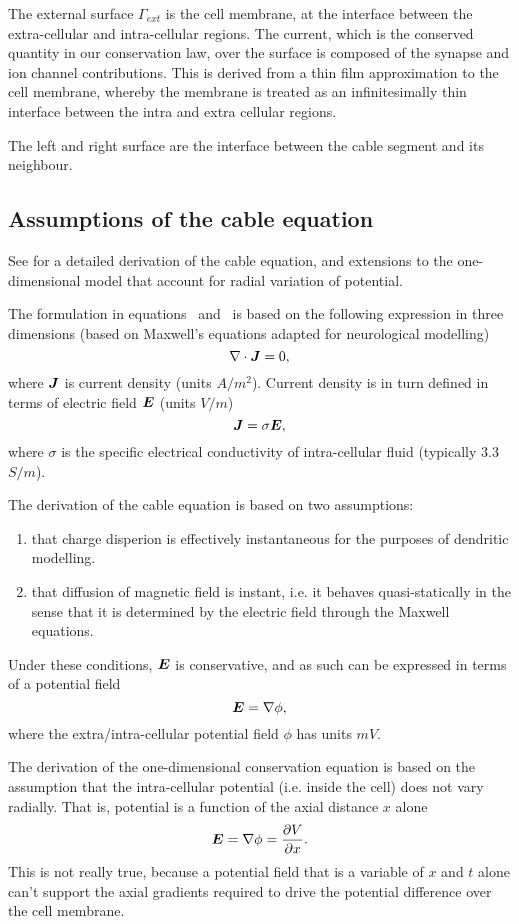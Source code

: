The external surface $\Gamma_{ext}$ is the cell membrane, at the interface between the extra-cellular and intra-cellular regions.
The current, which is the conserved quantity in our conservation law, over the surface is composed of the synapse and ion channel contributions.
This is derived from a thin film approximation to the cell membrane, whereby the membrane is treated as an infinitesimally thin interface between the intra and extra cellular regions.

The left and right surface are the interface between the cable segment and its neighbour.

\subsection{Assumptions of the cable equation}
See \cite{lindsay_2004} for a detailed derivation of the cable equation, and extensions to the one-dimensional model that account for radial variation of potential.

The formulation in equations~ and~ is based on the following expression in three dimensions (based on Maxwell's equations adapted for neurological modelling)
\begin{equation}
    \nabla \cdot \bm{J} = 0,
\end{equation}
where $\bm{J}$ is current density (units $A/m^2$).
Current density is in turn defined in terms of electric field $\bm{E}$ (units $V/m$)
\begin{equation}
    \bm{J} = \sigma \bm{E},
\end{equation}
where $\sigma$ is the specific electrical conductivity of intra-cellular fluid (typically 3.3 $S/m$).

The derivation of the cable equation is based on two assumptions:
\begin{enumerate}
    \item that charge disperion is effectively instantaneous for the purposes of dendritic modelling.
    \item that diffusion of magnetic field is instant, i.e. it behaves quasi-statically in the sense that it is determined by the electric field through the Maxwell equations.
\end{enumerate}
Under these conditions, $\bm{E}$ is conservative, and as such can be expressed in terms of a potential field
\begin{equation}
    \bm{E} = \nabla \phi,
\end{equation}
where the extra/intra-cellular potential field $\phi$ has units $mV$.

The derivation of the one-dimensional conservation equation  is based on the assumption that the intra-cellular potential (i.e. inside the cell) does not vary radially.
That is, potential is a function of the axial distance $x$ alone
\begin{equation}
    \bm{E} = \nabla \phi = \frac{\partial{V}}{\partial{x}}.
\end{equation}
This is not really true, because a potential field that is a variable of $x$ and $t$ alone can't support the axial gradients required to drive the potential difference over the cell membrane.
